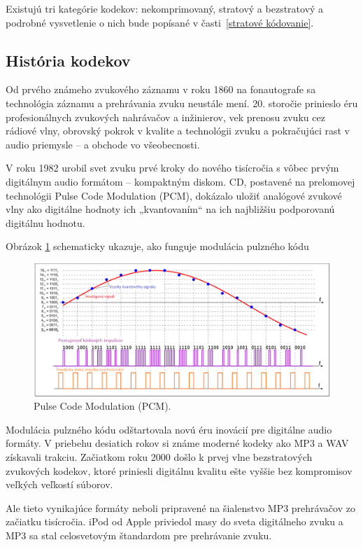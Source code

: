 \documentclass[10pt,twoside,slovak,a4paper]{article}
\begin{document}
Existujú tri kategórie kodekov: nekomprimovaný, stratový a bezstratový a podrobné vysvetlenie o nich bude popísané v časti~\ref{stratové kódovanie}.

\subsection{História kodekov} \label{história} 

Od prvého známeho zvukového záznamu v roku 1860 na fonautografe sa technológia záznamu a prehrávania zvuku neustále mení. 20. storočie prinieslo éru profesionálnych zvukových nahrávačov a inžinierov, vek prenosu zvuku cez rádiové vlny, obrovský pokrok v kvalite a technológii zvuku a pokračujúci rast v audio priemysle – a obchode vo všeobecnosti. \cite{Stephens} 

V roku 1982 urobil svet zvuku prvé kroky do nového tisícročia s vôbec prvým digitálnym audio formátom – kompaktným diskom. CD, postavené na prelomovej technológii Pulse Code Modulation (PCM), dokázalo uložiť analógové zvukové vlny ako digitálne hodnoty ich „kvantovaním“ na ich najbližšiu podporovanú digitálnu hodnotu.\cite{Stephens} 

Obrázok \ref{f:rozhod0} schematicky ukazuje, ako funguje modulácia pulzného kódu  
\begin{figure}[tbh]
\centering
\includegraphics[scale=0.5]{Pcm.png}
\caption{Pulse Code Modulation (PCM).\cite{Stephens} }
\label{f:rozhod0}
\end{figure}

Modulácia pulzného kódu odštartovala novú éru inovácií pre digitálne audio formáty. V priebehu desiatich rokov si známe moderné kodeky ako MP3 a WAV získavali trakciu. Začiatkom roku 2000 došlo k prvej vlne bezstratových zvukových kodekov, ktoré priniesli digitálnu kvalitu ešte vyššie bez kompromisov veľkých veľkostí súborov.\cite{Stephens}

Ale tieto vynikajúce formáty neboli pripravené na šialenstvo MP3 prehrávačov zo začiatku tisícročia. iPod od Apple priviedol masy do sveta digitálneho zvuku a MP3 sa stal celosvetovým štandardom pre prehrávanie zvuku.\cite{Stephens}
\end{document}

